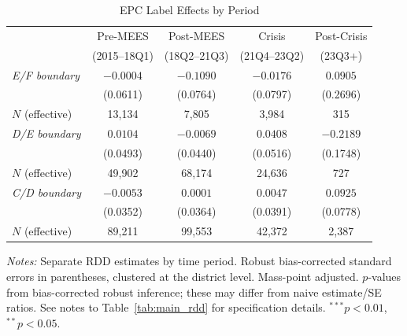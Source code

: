 \begin{table}[htbp]
\centering
\caption{EPC Label Effects by Period}
\label{tab:crisis}
\begin{tabular}{lcccc}
\toprule
 & Pre-MEES & Post-MEES & Crisis & Post-Crisis \\
 & (2015--18Q1) & (18Q2--21Q3) & (21Q4--23Q2) & (23Q3+) \\
\midrule
\textit{E/F boundary} & $-0.0004$ & $-0.1090$ & $-0.0176$ & $0.0905$ \\
 & (0.0611) & (0.0764) & (0.0797) & (0.2696) \\
\quad $N$ (effective) & 13,134 & 7,805 & 3,984 & 315 \\
\addlinespace
\textit{D/E boundary} & $0.0104$ & $-0.0069$ & $0.0408$ & $-0.2189$ \\
 & (0.0493) & (0.0440) & (0.0516) & (0.1748) \\
\quad $N$ (effective) & 49,902 & 68,174 & 24,636 & 727 \\
\addlinespace
\textit{C/D boundary} & $-0.0053$ & $0.0001$ & $0.0047$ & $0.0925$ \\
 & (0.0352) & (0.0364) & (0.0391) & (0.0778) \\
\quad $N$ (effective) & 89,211 & 99,553 & 42,372 & 2,387 \\
\bottomrule
\end{tabular}
\begin{minipage}{\textwidth}
\footnotesize
\textit{Notes:} Separate RDD estimates by time period. Robust bias-corrected standard errors
in parentheses, clustered at the district level. Mass-point adjusted.
$p$-values from bias-corrected robust inference; these may differ from naive estimate/SE ratios.
See notes to Table~\ref{tab:main_rdd} for specification details.
$^{***}p<0.01$, $^{**}p<0.05$.
\end{minipage}
\end{table}
